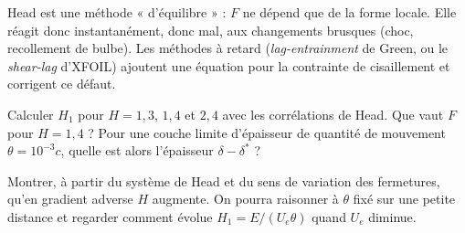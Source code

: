 \begin{piege}
Head est une méthode « d'équilibre » : $F$ ne dépend que de la forme locale. Elle réagit donc instantanément, donc mal, aux changements brusques (choc, recollement de bulbe). Les méthodes à retard (\emph{lag-entrainment} de Green, ou le \emph{shear-lag} d'XFOIL) ajoutent une équation pour la contrainte de cisaillement et corrigent ce défaut.
\end{piege}

\exercices
\begin{exercice}
Calculer $H_1$ pour $H=1{,}3$, $1{,}4$ et $2{,}4$ avec les corrélations de Head. Que vaut $F$ pour $H=1{,}4$ ? Pour une couche limite d'épaisseur de quantité de mouvement $\theta=10^{-3}c$, quelle est alors l'épaisseur $\delta-\delta^*$ ?
\end{exercice}
\begin{exercice}
Montrer, à partir du système de Head et du sens de variation des fermetures, qu'en gradient adverse $H$ augmente. On pourra raisonner à $\theta$ fixé sur une petite distance et regarder comment évolue $H_1=E/(U_e\theta)$ quand $U_e$ diminue.
\end{exercice}
